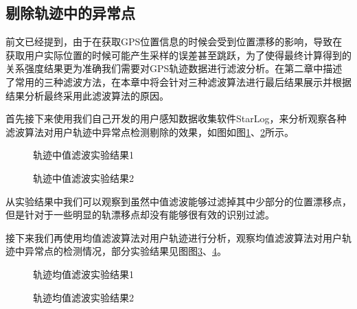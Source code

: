 \subsection{剔除轨迹中的异常点}
前文已经提到，由于在获取GPS位置信息的时候会受到位置漂移的影响，导致在获取用户实际位置的时候可能产生采样的误差甚至跳跃，为了使得最终计算得到的关系强度结果更为准确我们需要对GPS轨迹数据进行滤波分析。在第二章中描述了常用的三种滤波方法，在本章中将会针对三种滤波算法进行最后结果展示并根据结果分析最终采用此滤波算法的原因。
\par 首先接下来使用我们自己开发的用户感知数据收集软件StarLog，来分析观察各种滤波算法对用户轨迹中异常点检测剔除的效果，如图如图\ref{fig:3_2_1}、\ref{fig:3_2_2}所示。
\begin{figure}[htb]
  \centering%
  \hspace{4em}%
  \caption{轨迹中值滤波实验结果1}
  \label{fig:3_2_1}
\end{figure}
\begin{figure}[htb]
  \centering%
  \hspace{4em}%
  \caption{轨迹中值滤波实验结果2}
  \label{fig:3_2_2}
\end{figure}
\par 从实验结果中我们可以观察到虽然中值滤波能够过滤掉其中少部分的位置漂移点，但是针对于一些明显的轨漂移点却没有能够很有效的识别过滤。
\par 接下来我们再使用均值滤波算法对用户轨迹进行分析，观察均值滤波算法对用户轨迹中异常点的检测情况，部分实验结果见图图\ref{fig:3_3_1}、\ref{fig:3_3_2}。
\begin{figure}[htb]
  \centering%
  \hspace{4em}%
  \caption{轨迹均值滤波实验结果1}
  \label{fig:3_3_1}
\end{figure}
\begin{figure}[htb]
  \centering%
  \hspace{4em}%
  \caption{轨迹均值滤波实验结果2}
  \label{fig:3_3_2}
\end{figure}
